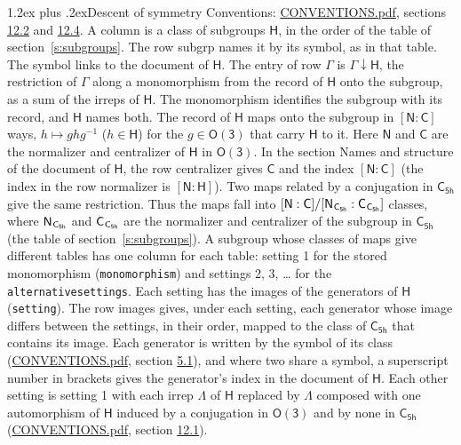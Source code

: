 \documentclass[10pt,a4paper]{article}
\makeatletter
\renewcommand\section{\@startsection{section}{1}{\z@}{-3ex plus -1ex minus -.2ex}%
  {1.2ex plus .2ex}{\normalfont\large\sffamily\bfseries\color{parttitle}}}
\numberwithin{equation}{section}
\newcommand{\grp}[1]{\mathsf{#1}}
\newcommand{\grpindex}[2]{[#1 : #2]}
\newcommand{\restr}[2]{#1\!\downarrow#2}
\newcommand{\hairsp}{\mkern1mu}
\makeatother
\begin{document}
\section{Descent of symmetry}\label{s:subduction}
Conventions: \href{../../CONVENTIONS.pdf}{CONVENTIONS.pdf}, sections \href{../../CONVENTIONS.pdf\#conv.12.2}{12.2} and \href{../../CONVENTIONS.pdf\#conv.12.4}{12.4}.
A column is a class of subgroups $\grp{H}$, in the order of the table of section~\ref{s:subgroups}. The row subgrp names it by its symbol, as in that table. The symbol links to the document of $\grp{H}$. The entry of row $\Gamma$ is $\restr{\Gamma}{\grp{H}}$, the restriction of $\Gamma$ along a monomorphism from the record of $\grp{H}$ onto the subgroup, as a sum of the irreps of $\grp{H}$. The monomorphism identifies the subgroup with its record, and $\grp{H}$ names both. \label{n:group.normalizer.o3}\label{n:group.centralizer.o3}The record of $\grp{H}$ maps onto the subgroup in $\grpindex{\grp{N}}{\grp{C}}$ ways, $h \mapsto g h g^{-1}$ ($h \in \grp{H}$) for the $g \in \grp{O(3)}$ that carry $\grp{H}$ to it. Here $\grp{N}$ and $\grp{C}$ are the normalizer and centralizer of $\grp{H}$ in \href{O3.pdf}{$\grp{O(3)}$}. In the section Names and structure of the document of $\grp{H}$, the row centralizer gives $\grp{C}$ and the index $\grpindex{\grp{N}}{\grp{C}}$ (the index in the row normalizer is $\grpindex{\grp{N}}{\grp{H}}$). Two maps related by a conjugation in $\grp{C_{5h}}$ give the same restriction. Thus the maps fall into $\grpindex{\grp{N}}{\grp{C}}/\grpindex{\grp{N}_{\hairsp \grp{C_{5h}}}}{\grp{C}_{\hairsp \grp{C_{5h}}}}$ classes, where $\grp{N}_{\hairsp \grp{C_{5h}}}$ and $\grp{C}_{\hairsp \grp{C_{5h}}}$ are the normalizer and centralizer of the subgroup in $\grp{C_{5h}}$ (the table of section~\ref{s:subgroups}). \label{n:head.setting}A subgroup whose classes of maps give different tables has one column for each table: setting 1 for the stored monomorphism (\texttt{monomorphism}) and settings 2, 3, \dots{} for the \texttt{alternativesettings}. Each setting has the images of the generators of $\grp{H}$ (\texttt{setting}). \label{n:head.images}The row images gives, under each setting, each generator whose image differs between the settings, in their order, mapped to the class of $\grp{C_{5h}}$ that contains its image. Each generator is written by the symbol of its class (\href{../../CONVENTIONS.pdf}{CONVENTIONS.pdf}, section \href{../../CONVENTIONS.pdf\#conv.5.1}{5.1}), and where two share a symbol, a superscript number in brackets gives the generator's index in the document of $\grp{H}$. \label{n:irrep.Delta}Each other setting is setting 1 with each irrep $\Lambda$ of $\grp{H}$ replaced by $\Lambda$ composed with one automorphism of $\grp{H}$ induced by a conjugation in \href{O3.pdf}{$\grp{O(3)}$} and by none in $\grp{C_{5h}}$ (\href{../../CONVENTIONS.pdf}{CONVENTIONS.pdf}, section \href{../../CONVENTIONS.pdf\#conv.12.1}{12.1}).
\end{document}
